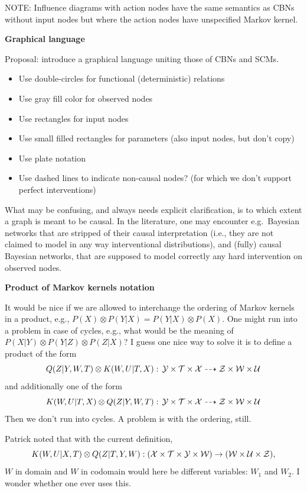 NOTE: Influence diagrams with action nodes have the same semantics
as CBNs without input nodes but where the action nodes have 
unspecified Markov kernel.

\textbf{Graphical language}

Proposal: introduce a graphical language uniting those of CBNs and SCMs.
\begin{itemize}
  \item Use double-circles for functional (deterministic) relations
  \item Use gray fill color for observed nodes
  \item Use rectangles for input nodes
  \item Use small filled rectangles for parameters (also input nodes, but don't copy)
  \item Use plate notation
  \item Use dashed lines to indicate non-causal nodes? (for which we don't support perfect interventions)
\end{itemize}
What may be confusing, and always needs explicit clarification, is to which extent
a graph is meant to be causal. In the literature, one may encounter e.g.\ Bayesian
networks that are stripped of their causal interpretation (i.e., they are not claimed
to model in any way interventional distributions), and (fully) causal Bayesian networks,
that are supposed to model correctly any hard intervention on observed nodes.

\textbf{Product of Markov kernels notation}

It would be nice if we are allowed to interchange the ordering of Markov kernels in a product, e.g.,
$P(X) \otimes P(Y|X) = P(Y|X) \otimes P(X)$.
One might run into a problem in case of cycles, e.g., what would be the meaning of $P(X|Y) \otimes P(Y|Z) \otimes P(Z|X)$?
I guess one nice way to solve it is to define a product of the form
$$Q(Z|Y,W,T) \otimes K(W,U|T,X) :\, \mathcal{Y} \times \mathcal{T} \times \mathcal{X} \dashrightarrow \mathcal{Z} \times \mathcal{W} \times \mathcal{U}$$
and additionally one of the form
$$K(W,U|T,X) \otimes Q(Z|Y,W,T) :\, \mathcal{Y} \times \mathcal{T} \times \mathcal{X} \dashrightarrow \mathcal{Z} \times \mathcal{W} \times \mathcal{U}$$
Then we don't run into cycles. A problem is with the ordering, still.

Patrick noted that with the current definition,
$$K(W,U|X,T) \otimes Q(Z|T,Y,W): (\mathcal{X} \times \mathcal{T} \times \mathcal{Y} \times \mathcal{W}) \to (\mathcal{W} \times \mathcal{U} \times \mathcal{Z}),$$
$W$ in domain and $W$ in codomain would here be different variables: $W_1$ and $W_2$.
I wonder whether one ever uses this. 

